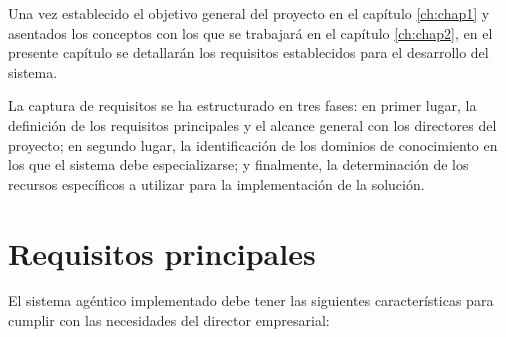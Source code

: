 Una vez establecido el objetivo general del proyecto en el capítulo \ref{ch:chap1} y asentados los conceptos con los que se trabajará en el capítulo \ref{ch:chap2}, en el presente capítulo se detallarán los requisitos establecidos para el desarrollo del sistema.

La captura de requisitos se ha estructurado en tres fases: en primer lugar, la definición de los requisitos principales y el alcance general con los directores del proyecto; en segundo lugar, la identificación de los dominios de conocimiento en los que el sistema debe especializarse; y finalmente, la determinación de los recursos específicos a utilizar para la implementación de la solución.

\section{Requisitos principales}

El sistema agéntico implementado debe tener las siguientes características para cumplir con las necesidades del director empresarial: 

